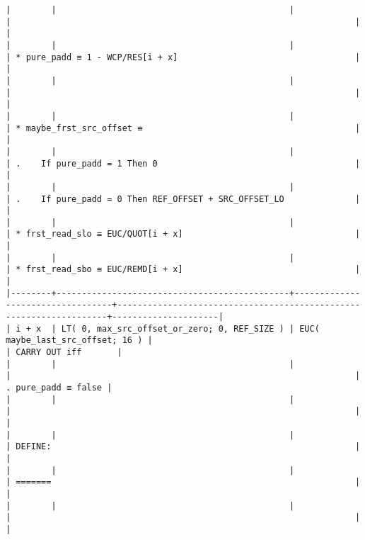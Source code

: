 \documentclass[varwidth=\maxdimen,margin=0.5cm,multi={verbatim}]{standalone}
\begin{document}
\begin{verbatim}
|        |                                              |                                  |                                                                    |                     |
|        |                                              |                                  | * pure_padd ≡ 1 - WCP/RES[i + x]                                   |                     |
|        |                                              |                                  |                                                                    |                     |
|        |                                              |                                  | * maybe_frst_src_offset ≡                                          |                     |
|        |                                              |                                  | .    If pure_padd = 1 Then 0                                       |                     |
|        |                                              |                                  | .    If pure_padd = 0 Then REF_OFFSET + SRC_OFFSET_LO              |                     |
|        |                                              |                                  | * frst_read_slo ≡ EUC/QUOT[i + x]                                  |                     |
|        |                                              |                                  | * frst_read_sbo ≡ EUC/REMD[i + x]                                  |                     |
|--------+----------------------------------------------+----------------------------------+--------------------------------------------------------------------+---------------------|
| i + x  | LT( 0, max_src_offset_or_zero; 0, REF_SIZE ) | EUC( maybe_last_src_offset; 16 ) |                                                                    | CARRY OUT iff       |
|        |                                              |                                  |                                                                    | . pure_padd ≡ false |
|        |                                              |                                  |                                                                    |                     |
|        |                                              |                                  | DEFINE:                                                            |                     |
|        |                                              |                                  | =======                                                            |                     |
|        |                                              |                                  |                                                                    |                     |

\end{verbatim}
\end{document}

